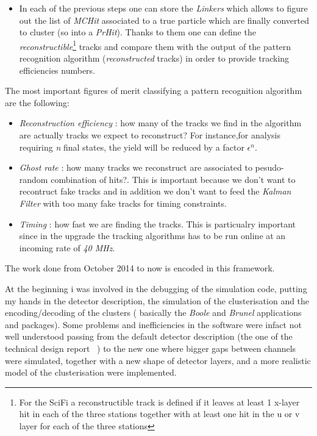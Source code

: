 \documentclass[paper=a4, fontsize=10pt]{scrartcl}
\numberwithin{equation}{section}		%
\numberwithin{figure}{section}			%
\numberwithin{table}{section}				%
\begin{document}
\begin{itemize}
\item{In each of the previous steps one can store the \textit{Linkers} which allows to figure out the list of \textit{MCHit} associated to a true particle which are finally converted to cluster (so into a \textit{PrHit}). 
Thanks to them one can define the \textit{reconstructible}\footnote{For the SciFi a reconstructible track is defined if it leaves at least 1 x-layer hit in each of the three stations together with at least one hit in the u or v layer for each of the three stations} tracks and compare them with the output of the pattern recognition algorithm (\textit{reconstructed} tracks) in order to provide tracking efficiencies numbers.}
\end{itemize}

The most important figures of merit classifying a pattern recognition algorithm are the following:\begin{itemize}
\item{\textit{Reconstruction efficiency} : how many of the tracks we find in the algorithm are actually tracks we expect to reconstruct? For instance,for analysis requiring \textit{n} final states, the yield will be reduced by a factor $\epsilon ^{n}$.}
\item{\textit{Ghost rate} : how many tracks we reconstruct are associated to pesudo-random combination of hits?. This is important because we don't want to recontruct fake tracks and in addition we don't want to feed the \textit{Kalman Filter} with too many fake tracks for timing constraints.}
\item{\textit{Timing} : how fast we are finding the tracks. This is particualry important since in the upgrade the tracking algorithms has to be run online at an incoming rate of \textit{40 MHz}.}
\end{itemize}

The work done from October 2014 to now is encoded in this framework. 

At the beginning i was involved in the debugging of the simulation code, putting my hands in the detector description, the simulation of the clusterisation and the encoding/decoding of the clusters  ( basically the \textit{Boole} and \textit{Brunel} applications and packages). 
Some problems and inefficiencies in the software were infact not well understood passing from the default detector description (the one of the technical design report ~\cite{SciFiTDR}) to the new one where bigger gaps between channels were simulated, together with a new shape of detector layers, and a more realistic model of the clusterisation were implemented. 
\end{document}
